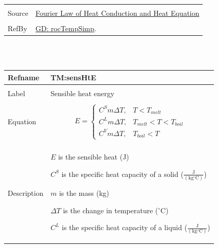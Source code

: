 \documentclass[12pt]{article}
\begin{document}
\begin{minipage}{\textwidth}
\begin{tabular}{p{} p{}}
                                         \\ \midrule \\
                                         Source & \hyperref[http://www.efunda.com/formulae/heat_transfer/conduction/overview_cond.cfm]{Fourier Law of Heat Conduction and Heat Equation}
                                                  \\ \midrule \\
                                                  RefBy & \hyperref[GD:rocTempSimp]{GD: rocTempSimp}.
\\ \bottomrule \end{tabular}
\end{minipage}\\
~\newline
 \noindent \begin{minipage}{\textwidth}
\begin{tabular}{p{} p{}}
\toprule \textbf{Refname} & \textbf{TM:sensHtE}
\label{TM:sensHtE}
\\ \midrule \\
Label & Sensible heat energy
        \\ \midrule \\
        Equation & \begin{dmath}
                   E=\begin{cases}
{C^{S}} m ΔT, & T<{T_{melt}}\\
{C^{L}} m ΔT, & {T_{melt}}<T<{T_{boil}}\\
{C^{V}} m ΔT, & {T_{boil}}<T
\end{cases}
                   \end{dmath}
                   \\ \midrule \\
                   Description & \begin{symbDescription}
                                 \item{$E$ is the sensible heat (J)}
                                 \item{${C^{S}}$ is the specific heat capacity of a solid ($\frac{\text{J}}{(\text{kg}{}^{\circ}\text{C})}$)}
                                 \item{$m$ is the mass (kg)}
                                 \item{$ΔT$ is the change in temperature (${}^{\circ}$C)}
                                 \item{${C^{L}}$ is the specific heat capacity of a liquid ($\frac{\text{J}}{(\text{kg}{}^{\circ}\text{C})}$)}

\end{symbDescription}
\end{tabular}
\end{minipage}
\end{document}
